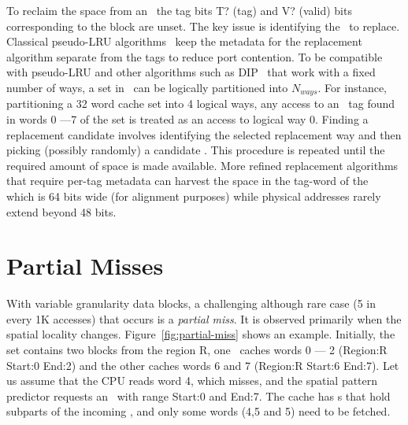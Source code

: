 To reclaim the space from an \AB\, the tag bits T? (tag) and V? (valid) bits corresponding to the block are unset. The key issue is identifying the \AB\ to replace. Classical pseudo-LRU algorithms~\cite{Kedzierski-ipdps-2010,manual:OpenSparcT1} keep the metadata for the replacement algorithm separate from the tags to reduce port contention. To be compatible with pseudo-LRU and other algorithms such as DIP~\cite{qureshi-isca-2007} that work with a fixed number of ways, a set in \AC\ can be logically partitioned into $N_{ways}$. For instance, partitioning a 32 word cache set into 4 logical ways, any access to an \AB\ tag found in words 0 ---7 of the set is treated as an access to logical way 0. Finding a replacement candidate involves identifying the selected replacement way and then picking (possibly randomly) a candidate \AB{}. This procedure is repeated until the required amount of space is made available. More refined replacement algorithms that require per-tag metadata can harvest the space in the tag-word of the \AB\, which is 64 bits wide (for alignment purposes) while physical addresses rarely extend beyond 48 bits.

\section{Partial Misses} 
\label{sec:partialmiss} 

With variable granularity data blocks, a challenging although rare case (5 in every 1K accesses) that occurs is a \textit{partial miss}. It is observed primarily when the spatial locality changes.  Figure~\ref{fig:partial-miss} shows an example. Initially, the set contains two blocks from the region R, one \AB\ caches words 0 --- 2 (Region:R Start:0 End:2) and the other caches words 6 and 7 (Region:R Start:6 End:7). Let us assume that the CPU reads word 4, which misses, and the spatial pattern predictor requests an \AB\ with range Start:0 and End:7. The cache has \AB{}s that hold subparts of the incoming \AB{}, and only some words (4,5 and 5) need to be fetched.

